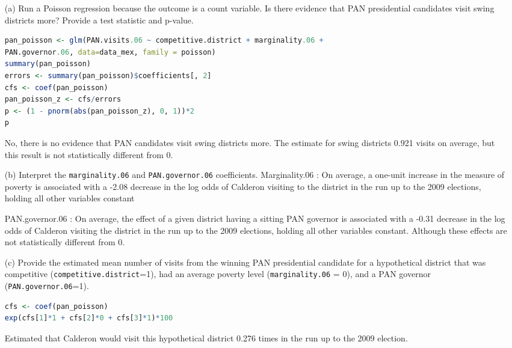 \documentclass[12pt,letterpaper]{article}
\begin{document}
\begin{enumerate}
	\item [(a)]
	Run a Poisson regression because the outcome is a count variable. Is there evidence that PAN presidential candidates visit swing districts more? Provide a test statistic and p-value.
\begin{lstlisting}[language=R] 
pan_poisson <- glm(PAN.visits.06 ~ competitive.district + marginality.06 + 
PAN.governor.06, data=data_mex, family = poisson)
summary(pan_poisson)
errors <- summary(pan_poisson)$coefficients[, 2]
cfs <- coef(pan_poisson)
pan_poisson_z <- cfs/errors
p <- (1 - pnorm(abs(pan_poisson_z), 0, 1))*2
p
\end{lstlisting}
No, there is no evidence that PAN candidates visit swing districts more. The estimate 
for swing districts 0.921 visits on average, but this result is not 
statistically different from 0.

	\item [(b)]
	Interpret the \texttt{marginality.06} and \texttt{PAN.governor.06} coefficients.
Marginality.06 : On average, a one-unit increase in the measure of poverty is 
associated with a -2.08 decrease in the log odds of Calderon visiting to the 
district in the run up to the 2009 elections, holding all other variables constant

PAN.governor.06 : On average, the effect of a given district having a sitting 
PAN governor is associated with a -0.31 decrease in the log odds of Calderon 
visiting the district in the run up to the 2009 elections, holding all other 
variables constant. Although these effects are not statistically different from 0.
	
	\item [(c)]
	Provide the estimated mean number of visits from the winning PAN presidential candidate for a hypothetical district that was competitive (\texttt{competitive.district}=1), had an average poverty level (\texttt{marginality.06} = 0), and a PAN governor (\texttt{PAN.governor.06}=1).
\begin{lstlisting}[language=R] 
cfs <- coef(pan_poisson)
exp(cfs[1]*1 + cfs[2]*0 + cfs[3]*1)*100
\end{lstlisting}	
Estimated that Calderon would visit this hypothetical district 0.276 times in 
the run up to the 2009 election.
\end{enumerate}
\end{document}
